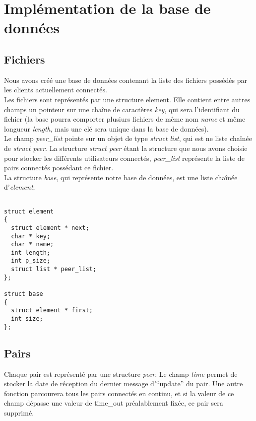 \section{Implémentation de la base de données}
\subsection{Fichiers}
Nous avons créé une base de données contenant la liste des fichiers possédés par les clients actuellement connectés. \\
Les fichiers sont représentés par une structure element. Elle contient entre autres champs un pointeur sur une chaîne de caractères \textit{key}, qui sera l'identifiant du fichier (la base pourra comporter plusiurs fichiers de même nom \textit{name} et même longueur \textit{length}, mais une clé sera unique dans la base de données). \\
Le champ \textit{peer\_list} pointe sur un objet de type \textit{struct list}, qui est ne liste chaînée de \textit{struct peer}. La structure \textit{struct peer} étant la structure que nous avons choisie pour stocker les différents utilisateurs connectés, \textit{peer\_list} représente la liste de pairs connectés possédant ce fichier.\\ 
La structure \textit{base}, qui représente notre base de données, est une liste chaînée d'\textit{element};\\
 
\begin{verbatim}

struct element
{
  struct element * next;
  char * key;
  char * name;
  int length;
  int p_size;
  struct list * peer_list; 
};

struct base
{
  struct element * first;
  int size;
};

\end{verbatim}

\subsection{Pairs}
  
Chaque pair est représenté par une structure \textit{peer}. Le champ \textit{time} permet de stocker la date de réception du dernier message d'``update'' du pair. Une autre fonction parcourera tous les pairs connectés en continu, et si la valeur de ce champ dépasse une valeur de time\_out préalablement fixée, ce pair sera supprimé.\\

